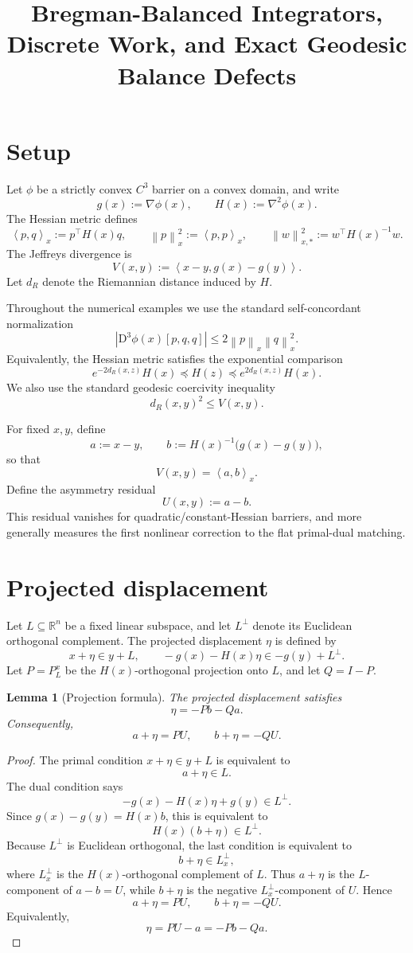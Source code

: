 \documentclass[11pt]{article}
\title{Bregman-Balanced Integrators, Discrete Work, and Exact Geodesic Balance Defects}
\author{}
\date{}
\newtheorem{lemma}{Lemma}
\newcommand{\ip}[2]{\left\langle #1,#2\right\rangle}
\newcommand{\norm}[1]{\left\lVert #1\right\rVert}
\newcommand{\R}{\mathbb R}
\newcommand{\D}{\mathrm D}
\begin{document}
\maketitle

\section{Setup}

Let $\phi$ be a strictly convex $C^3$ barrier on a convex domain, and write
\[
    g(x):=\nabla\phi(x),
    \qquad
    H(x):=\nabla^2\phi(x).
\]
The Hessian metric defines
\[
    \ip{p}{q}_x:=p^\top H(x)q,
    \qquad
    \norm{p}_x^2:=\ip{p}{p}_x,
    \qquad
    \norm{w}_{x,*}^2:=w^\top H(x)^{-1}w.
\]
The Jeffreys divergence is
\[
    V(x,y):=\ip{x-y}{g(x)-g(y)}.
\]
Let $d_R$ denote the Riemannian distance induced by $H$.

Throughout the numerical examples we use the standard self-concordant normalization
\[
    |\D^3\phi(x)[p,q,q]|
    \le
    2\norm{p}_x\norm{q}_x^2.
\]
Equivalently, the Hessian metric satisfies the exponential comparison
\[
    e^{-2d_R(x,z)}H(x)
    \preceq
    H(z)
    \preceq
    e^{2d_R(x,z)}H(x).
\]
We also use the standard geodesic coercivity inequality
\[
    d_R(x,y)^2\le V(x,y).
\]

For fixed $x,y$, define
\[
    a:=x-y,
    \qquad
    b:=H(x)^{-1}\bigl(g(x)-g(y)\bigr),
\]
so that
\[
    V(x,y)=\ip{a}{b}_x.
\]
Define the asymmetry residual
\[
    U(x,y):=a-b.
\]
This residual vanishes for quadratic/constant-Hessian barriers, and more generally measures the first nonlinear correction to the flat primal-dual matching.

\section{Projected displacement}

Let $L\subseteq \R^n$ be a fixed linear subspace, and let $L^\perp$ denote its Euclidean orthogonal complement. The projected displacement $\eta$ is defined by
\[
    x+\eta\in y+L,
    \qquad
    -g(x)-H(x)\eta\in -g(y)+L^\perp.
\]
Let $P=P_L^x$ be the $H(x)$-orthogonal projection onto $L$, and let $Q=I-P$.

\begin{lemma}[Projection formula]
The projected displacement satisfies
\[
    \eta=-Pb-Qa.
\]
Consequently,
\[
    a+\eta=PU,
    \qquad
    b+\eta=-QU.
\]
\end{lemma}

\begin{proof}
The primal condition $x+\eta\in y+L$ is equivalent to
\[
    a+\eta\in L.
\]
The dual condition says
\[
    -g(x)-H(x)\eta+g(y)\in L^\perp.
\]
Since $g(x)-g(y)=H(x)b$, this is equivalent to
\[
    H(x)(b+\eta)\in L^\perp.
\]
Because $L^\perp$ is Euclidean orthogonal, the last condition is equivalent to
\[
    b+\eta\in L_x^\perp,
\]
where $L_x^\perp$ is the $H(x)$-orthogonal complement of $L$.
Thus $a+\eta$ is the $L$-component of $a-b=U$, while $b+\eta$ is the negative $L_x^\perp$-component of $U$. Hence
\[
    a+\eta=PU,
    \qquad
    b+\eta=-QU.
\]
Equivalently,
\[
    \eta=PU-a=-Pb-Qa.
\]
\end{proof}
\end{document}
